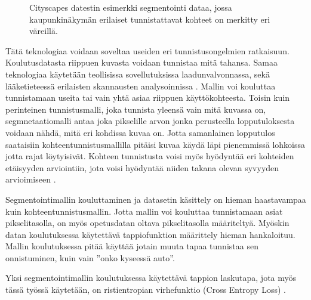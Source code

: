 \begin{figure}[h]
\centering
{}
\caption[Tämä on lyhyt kuvateksti.]{Cityscapes datestin esimerkki segmentointi dataa, jossa kaupunkinäkymän erilaiset tunnistattavat kohteet on merkitty eri väreillä.}
\label{fig:labels}
\end{figure}

Tätä teknologiaa voidaan soveltaa useiden eri tunnistusongelmien ratkaisuun.
Koulutusdatasta riippuen kuvasta voidaan tunnistaa mitä tahansa.
Samaa teknologiaa käytetään teollisissa sovellutuksissa laadunvalvonnassa,
sekä lääketieteessä erilaisten skannausten analysoinnissa \cite{NagalakshmiT2022BCSS}.
Mallin voi kouluttaa tunnistamaan useita tai vain yhtä asiaa riippuen käyttökohteesta.
Toisin kuin perinteinen tunnistusmalli, joka tunnista yleensä vain mitä kuvassa on,
segmnetaatiomalli antaa joka pikselille arvon jonka perusteella lopputuloksesta voidaan nähdä, mitä eri kohdissa kuvaa on.
Jotta samanlainen lopputulos saataisiin kohteentunnistusmallilla pitäisi kuvaa käydä läpi pienemmissä lohkoissa jotta rajat löytyisivät.
Kohteen tunnistusta voisi myös hyödyntää eri kohteiden etäisyyden arviointiin, jota voisi hyödyntää niiden takana olevan syvyyden arvioimiseen \cite{ShiZhou2023VRBo}.

Segmentointimallin kouluttaminen ja datasetin käsittely on hieman haastavampaa kuin kohteentunnistusmallin.
Jotta mallin voi kouluttaa tunnistamaan asiat pikselitasolla, on myös opetusdatan oltava pikselitasolla määriteltyä. 
Myöskin datan koulutuksessa käytettävä tappiofunktion määrittely hieman hankaloituu.
Mallin koulutuksessa pitää käyttää jotain muuta tapaa tunnistaa sen onnistuminen, kuin vain ”onko kyseessä auto”.

Yksi segmentointimallin koulutuksessa käytettävä tappion laskutapa, 
jota myös tässä työssä käytetään, on ristientropian virhefunktio (Cross Entropy Loss) \cite{CrossEntropyLoss}. 

